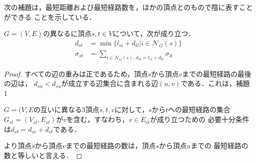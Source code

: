 次の補題は，最短距離および最短経路数を，ほかの頂点とのもので陰に表すことができる
ことを示している．

\begin{lemma}
  \label{lemma:distance-and-geodesics}
  $G=(V,E)$の異なるに頂点$s,t\in V$について，次が成り立つ．
  \begin{equation*}
    \begin{aligned}
      d_{st}&=\min\{l_{si}+d_{it}|i\in\mathcal{N}_G(s)\} \\
      \sigma_{st}&=\sum_{i\in\mathcal{N}_G(s),\,d_{st}=l_{si}+d_{it}}\sigma_{it}
    \end{aligned}
  \end{equation*}
\end{lemma}
\begin{proof}
  すべての辺の重みは正であるため，頂点$s$から頂点$v$までの最短経路の最後の辺は，
  $d_{su}<d_{su}$が成立する辺集合に含まれる辺$(u,v)$である．これは，補題1
  \par $G=(V,E$の互いに異なる3頂点$s,t,v$に対して，$s$から$t$への最短経路の集合
  $G_{st}=(V_{st},E_{st})$が$v$を含む，すなわち，$v\in E_{st}$が成り立つための
  必要十分条件は$d_{st}=d_{sv}+d_{vt}$である．

  より頂点$s$から頂点$v$までの最短経路の数は，頂点$s$から頂点$u$までの
  最短経路の数と等しいと言える．
\end{proof}

